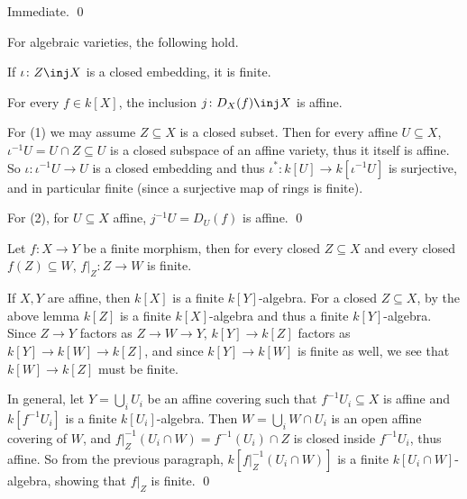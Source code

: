 \ecoro

\bproof

    Immediate.
    \qed

\eproof

\blemm

    For algebraic varieties, the following hold.
    \benum
        \item If $\iota\colon Z\inj X$ is a closed embedding, it is finite.
        \item For every $f\in k[X]$, the inclusion $j\colon D_X(f)\inj X$ is affine.
    \eenum

\elemm

\bproof

    For (1) we may assume $Z\subseteq X$ is a closed subset.
    Then for every affine $U\subseteq X$, $\iota^{-1}U=U\cap Z\subseteq U$ is a closed subspace of an affine variety, thus it itself is affine.
    So $\iota\colon\iota^{-1}U\to U$ is a closed embedding and thus $\iota^*\colon k[U]\to k[\iota^{-1}U]$ is surjective, and in particular
    finite (since a surjective map of rings is finite).

    For (2), for $U\subseteq X$ affine, $j^{-1}U=D_U(f)$ is affine.
    \qed

\eproof

\blemm

    Let $f\colon X\to Y$ be a finite morphism, then for every closed $Z\subseteq X$ and every closed $f(Z)\subseteq W$, $f|_Z\colon Z\to W$
    is finite.

\elemm

\bproof

    If $X,Y$ are affine, then $k[X]$ is a finite $k[Y]$-algebra.
    For a closed $Z\subseteq X$, by the above lemma $k[Z]$ is a finite $k[X]$-algebra and thus a finite $k[Y]$-algebra.
    Since $Z\to Y$ factors as $Z\to W\to Y$, $k[Y]\to k[Z]$ factors as $k[Y]\to k[W]\to k[Z]$, and since $k[Y]\to k[W]$ is finite as well, we see that
    $k[W]\to k[Z]$ must be finite.

    In general, let $Y=\bigcup_iU_i$ be an affine covering such that $f^{-1}U_i\subseteq X$ is affine and $k[f^{-1}U_i]$ is a finite $k[U_i]$-algebra.
    Then $W=\bigcup_iW\cap U_i$ is an open affine covering of $W$, and $f|_Z^{-1}(U_i\cap W)=f^{-1}(U_i)\cap Z$ is closed inside $f^{-1}U_i$, thus affine.
    So from the previous paragraph, $k[f|_Z^{-1}(U_i\cap W)]$ is a finite $k[U_i\cap W]$-algebra, showing that $f|_Z$ is finite.
    \qed

\eproof

